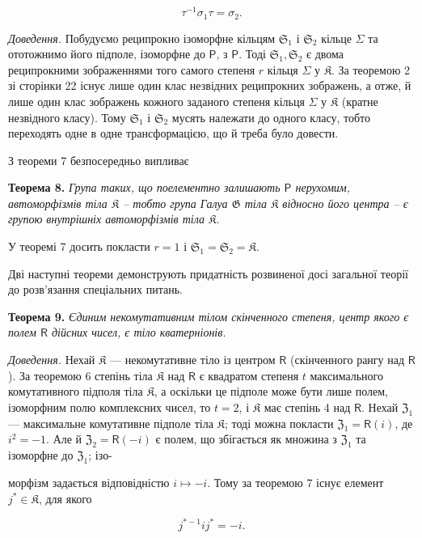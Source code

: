 \documentclass[11pt]{article}
\begin{document}
\[
\tau^{-1}\sigma_1\tau=\sigma_2.
\]

\emph{Доведення.} Побудуємо реципрокно ізоморфне кільцям \(\mathfrak S_1\) і \(\mathfrak S_2\) кільце \(\Sigma\) та ототожнимо його підполе, ізоморфне до \(\mathsf P\), з \(\mathsf P\). Тоді \(\mathfrak S_1,\mathfrak S_2\) є двома реципрокними зображеннями того самого степеня \(r\) кільця \(\Sigma\) у \(\mathfrak K\). За теоремою 2 зі сторінки 22 існує лише один клас незвідних реципрокних зображень, а отже, й лише один клас зображень кожного заданого степеня кільця \(\Sigma\) у \(\mathfrak K\) (кратне незвідного класу). Тому \(\mathfrak S_1\) і \(\mathfrak S_2\) мусять належати до одного класу, тобто переходять одне в одне трансформацією, що й треба було довести.

З теореми 7 безпосередньо випливає

\textbf{Теорема 8.} \emph{Група таких, що поелементно залишають \(\mathsf P\) нерухомим, автоморфізмів тіла \(\mathfrak K\) -- тобто група Галуа \(\mathfrak G\) тіла \(\mathfrak K\) відносно його центра -- є групою внутрішніх автоморфізмів тіла \(\mathfrak K\).}

У теоремі 7 досить покласти \(r=1\) і \(\mathfrak S_1=\mathfrak S_2=\mathfrak K\).

Дві наступні теореми демонструють придатність розвиненої досі загальної теорії до розв'язання спеціальних питань.

\textbf{Теорема 9.} \emph{Єдиним некомутативним тілом скінченного степеня, центр якого є полем \(\mathsf{R}\) дійсних чисел, є тіло кватерніонів.}

\emph{Доведення.} Нехай \(\mathfrak K\) --- некомутативне тіло із центром \(\mathsf{R}\) (скінченного рангу над \(\mathsf{R}\)). За теоремою 6 степінь тіла \(\mathfrak K\) над \(\mathsf{R}\) є квадратом степеня \(t\) максимального комутативного підполя тіла \(\mathfrak K\), а оскільки це підполе може бути лише полем, ізоморфним полю комплексних чисел, то \(t=2\), і \(\mathfrak K\) має степінь 4 над \(\mathsf{R}\). Нехай \(\mathfrak Z_1\) --- максимальне комутативне підполе тіла \(\mathfrak K\); тоді можна покласти \(\mathfrak Z_1=\mathsf{R}(i)\), де \(i^2=-1\). Але й \(\mathfrak Z_2=\mathsf{R}(-i)\) є полем, що збігається як множина з \(\mathfrak Z_1\) та ізоморфне до \(\mathfrak Z_1\); ізо-

морфізм задається відповідністю \(i\mapsto -i\). Тому за теоремою 7 існує елемент \(j^*\in\mathfrak K\), для якого

\[
j^{*-1}ij^*=-i.
\]
\end{document}
